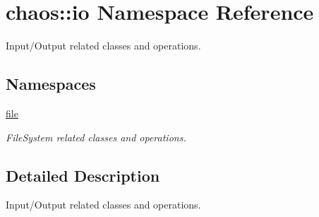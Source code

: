 \hypertarget{namespacechaos_1_1io}{}\section{chaos\+:\+:io Namespace Reference}
\label{namespacechaos_1_1io}


Input/\+Output related classes and operations.  


\subsection*{Namespaces}
\begin{DoxyCompactItemize}
\item 
 \hyperlink{namespacechaos_1_1io_1_1file}{file}
\begin{DoxyCompactList}\small\item\em File\+System related classes and operations. \end{DoxyCompactList}\end{DoxyCompactItemize}


\subsection{Detailed Description}
Input/\+Output related classes and operations. 
